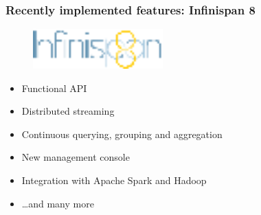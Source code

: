 \documentclass[10pt,utf8]{beamer}
\begin{document}
\begin{frame}
	\frametitle{Recently implemented features: Infinispan 8}
	\begin{figure}
		\centering
		\includegraphics[width=5cm]{./img/infinispan8.eps}
	\end{figure}
  \begin{itemize}
    \item Functional API
		\item Distributed streaming
		\item Continuous querying, grouping and aggregation
		\item New management console
		\item Integration with Apache Spark and Hadoop
		\item \dots and many more
  \end{itemize}
\end{frame}

\end{document}
